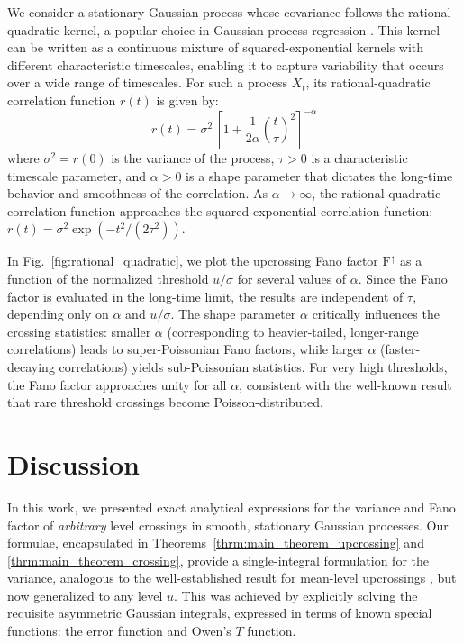 \documentclass[journal]{IEEEtran}
\theoremstyle{plain}
\theoremstyle{definition}
\theoremstyle{remark}
\newcommand{\FFup}{\mathrm{F}^\uparrow}
\begin{document}
We consider a stationary Gaussian process whose covariance follows the rational-quadratic kernel, a popular choice in Gaussian-process regression \cite{williams2006gaussian}. This kernel can be written as a continuous mixture of squared-exponential kernels with different characteristic timescales, enabling it to capture variability that occurs over a wide range of timescales. For such a process $X_t$, its rational-quadratic correlation function $r(t)$ is given by:
\begin{equation}
    r(t) = \sigma^2 \, \left[1 + \frac{1}{2\alpha}\left(\frac{t}{\tau}\right)^2\right]^{-\alpha}
\end{equation}
where $\sigma^2 = r(0)$ is the variance of the process, $\tau>0$ is a characteristic timescale parameter, and $\alpha>0$ is a shape parameter that dictates the long-time behavior and smoothness of the correlation. As $\alpha\rightarrow\infty$, the rational-quadratic correlation function approaches the squared exponential correlation function: $r(t) = \sigma^2 \exp\left(-t^2/(2\tau^2)\right)$.

In Fig.~\ref{fig:rational_quadratic}, we plot the upcrossing Fano factor $\FFup$ as a function of the normalized threshold $u/\sigma$ for several values of $\alpha$. Since the Fano factor is evaluated in the long-time limit, the results are independent of $\tau$, depending only on $\alpha$ and $u/\sigma$. The shape parameter $\alpha$ critically influences the crossing statistics: smaller $\alpha$ (corresponding to heavier-tailed, longer-range correlations) leads to super-Poissonian Fano factors, while larger $\alpha$ (faster-decaying correlations) yields sub-Poissonian statistics. For very high thresholds, the Fano factor approaches unity for all $\alpha$, consistent with the 
well-known result that rare threshold crossings 
become Poisson-distributed. 











\section{Discussion}

In this work, we presented exact analytical expressions for the variance and Fano factor of \textit{arbitrary} level crossings in smooth, stationary Gaussian processes. Our formulae, encapsulated in Theorems~\ref{thrm:main_theorem_upcrossing} and  \ref{thrm:main_theorem_crossing}, provide a single-integral formulation for the variance, analogous to the well-established result for mean-level upcrossings \cite{steinberg1955short}, but now generalized to any level $u$. This was achieved by explicitly solving the requisite asymmetric Gaussian integrals, expressed in terms of known special functions: the error function and Owen's $T$ function.
\end{document}
